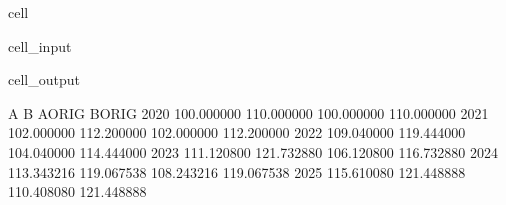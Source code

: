 \documentclass[letterpaper,10pt,english]{jupyterBook}
\begin{document}
\begin{sphinxuseclass}{cell}\begin{sphinxVerbatimInput}

\begin{sphinxuseclass}{cell_input}
\begin{sphinxVerbatim}[commandchars=\\\{\}]
  
       \PYG{p}{[}    \PYG{p}{]} 
       \PYG{p}{[}\PYG{p}{]}                                 
\end{sphinxVerbatim}

\end{sphinxuseclass}\end{sphinxVerbatimInput}
\begin{sphinxVerbatimOutput}

\begin{sphinxuseclass}{cell_output}
\begin{sphinxVerbatim}[commandchars=\\\{\}]
               A           B      A\PYGZus{}ORIG      B\PYGZus{}ORIG
2020  100.000000  110.000000  100.000000  110.000000
2021  102.000000  112.200000  102.000000  112.200000
2022  109.040000  119.444000  104.040000  114.444000
2023  111.120800  121.732880  106.120800  116.732880
2024  113.343216  119.067538  108.243216  119.067538
2025  115.610080  121.448888  110.408080  121.448888
\end{sphinxVerbatim}

\end{sphinxuseclass}\end{sphinxVerbatimOutput}

\end{sphinxuseclass}
\end{document}
